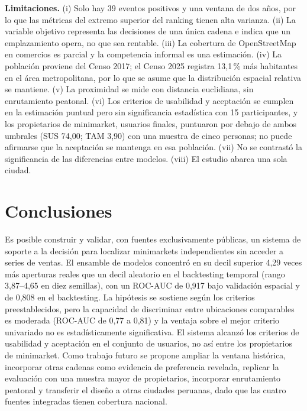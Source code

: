 \documentclass[10pt,letterpaper,twocolumn]{article}
\begin{document}
\textbf{Limitaciones.} (i) Solo hay 39 eventos positivos y una ventana de dos años, por lo que las métricas del extremo superior del ranking tienen alta varianza. (ii) La variable objetivo representa las decisiones de una única cadena e indica que un emplazamiento opera, no que sea rentable. (iii) La cobertura de OpenStreetMap en comercios es parcial y la competencia informal es una estimación. (iv) La población proviene del Censo 2017; el Censo 2025 \citep{inei2026} registra 13,1\,\% más habitantes en el área metropolitana, por lo que se asume que la distribución espacial relativa se mantiene. (v) La proximidad se mide con distancia euclidiana, sin enrutamiento peatonal. (vi) Los criterios de usabilidad y aceptación se cumplen en la estimación puntual pero sin significancia estadística con 15 participantes, y los propietarios de minimarket, usuarios finales, puntuaron por debajo de ambos umbrales (SUS 74,00; TAM 3,90) con una muestra de cinco personas; no puede afirmarse que la aceptación se mantenga en esa población. (vii) No se contrastó la significancia de las diferencias entre modelos. (viii) El estudio abarca una sola ciudad.

\section{Conclusiones}

Es posible construir y validar, con fuentes exclusivamente públicas, un sistema de soporte a la decisión para localizar minimarkets independientes sin acceder a series de ventas. El ensamble de modelos concentró en su decil superior 4,29 veces más aperturas reales que un decil aleatorio en el backtesting temporal (rango 3,87--4,65 en diez semillas), con un ROC-AUC de 0,917 bajo validación espacial y de 0,808 en el backtesting. La hipótesis se sostiene según los criterios preestablecidos, pero la capacidad de discriminar entre ubicaciones comparables es moderada (ROC-AUC de 0,77 a 0,81) y la ventaja sobre el mejor criterio univariado no es estadísticamente significativa. El sistema alcanzó los criterios de usabilidad y aceptación en el conjunto de usuarios, no así entre los propietarios de minimarket. Como trabajo futuro se propone ampliar la ventana histórica, incorporar otras cadenas como evidencia de preferencia revelada, replicar la evaluación con una muestra mayor de propietarios, incorporar enrutamiento peatonal y transferir el diseño a otras ciudades peruanas, dado que las cuatro fuentes integradas tienen cobertura nacional.
\end{document}
